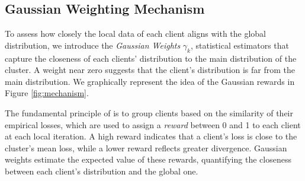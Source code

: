 \subsection{Gaussian Weighting Mechanism}
\label{section:gaussian_rewards} 
To assess how closely the local data of each client aligns with the global distribution, we introduce the \textit{Gaussian Weights} $\gamma_k$, statistical estimators that capture the closeness of each clients' distribution to the main distribution of the cluster. A weight near zero suggests that the client's distribution is far from the main distribution. We graphically represent the idea of the Gaussian rewards in Figure \ref{fig:mechanism}. 

The fundamental principle of \shortname is to group clients based on the similarity of their empirical losses, which are used to assign a \textit{reward} between 0 and 1 to each client at each local iteration. A high reward indicates that a client's loss is close to the cluster's mean loss, while a lower reward reflects greater divergence. Gaussian weights estimate the expected value of these rewards, quantifying the closeness between each client’s distribution and the global one. 

